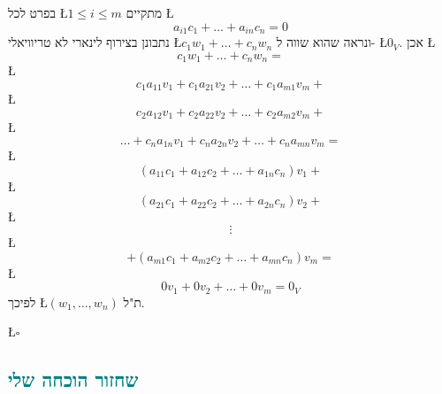\documentclass[english,hebrew]{article}
\begin{document}
בפרט לכל \L{$1\le i\le m$} מתקיים \L{%
\[
a_{i1}c_{1}+\dots+a_{in}c_{n}=0
\]
}%
נתבונן בצירוף לינארי לא טריוויאלי \L{$c_{1}w_{1}+\dots+c_{n}w_{n}$}
ונראה שהוא שווה ל- \L{$0_{V}$}. אכן \L{%
\[
c_{1}w_{1}+\dots+c_{n}w_{n}=
\]
}%
\L{%
\[
c_{1}a_{11}v_{1}+c_{1}a_{21}v_{2}+\dots+c_{1}a_{m1}v_{m}+
\]
}%
\L{%
\[
c_{2}a_{12}v_{1}+c_{2}a_{22}v_{2}+\dots+c_{2}a_{m2}v_{m}+
\]
}%
\L{%
\[
\dots+c_{n}a_{1n}v_{1}+c_{n}a_{2n}v_{2}+\dots+c_{n}a_{mn}v_{m}=
\]
}%
\L{%
\[
(a_{11}c_{1}+a_{12}c_{2}+\dots+a_{1n}c_{n})v_{1}+
\]
}%
\L{%
\[
(a_{21}c_{1}+a_{22}c_{2}+\dots+a_{2n}c_{n})v_{2}+
\]
}%
\L{%
\[
\vdots
\]
}%
\L{%
\[
+(a_{m1}c_{1}+a_{m2}c_{2}+\dots+a_{mn}c_{n})v_{m}=
\]
}%
\L{%
\[
0v_{1}+0v_{2}+\dots+0v_{m}=0_{V}
\]
}%
לפיכך \L{$(w_{1},\dots,w_{n})$} ת"ל.
\begin{flushright}
\L{$\square$}
\par\end{flushright}

\subsection{\textcolor{teal}{שחזור הוכחה שלי}}
\end{document}
